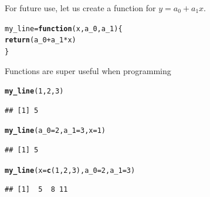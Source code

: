 \documentclass[aspectratio=169]{beamer}\usepackage[]{graphicx}\usepackage[]{xcolor}
\makeatletter
\newcommand{\hlnum}[1]{\textcolor[rgb]{0.686,0.059,0.569}{#1}}%
\newcommand{\hlopt}[1]{\textcolor[rgb]{0,0,0}{#1}}%
\newcommand{\hlstd}[1]{\textcolor[rgb]{0.345,0.345,0.345}{#1}}%
\newcommand{\hlkwa}[1]{\textcolor[rgb]{0.161,0.373,0.58}{\textbf{#1}}}%
\newcommand{\hlkwb}[1]{\textcolor[rgb]{0.69,0.353,0.396}{#1}}%
\newcommand{\hlkwc}[1]{\textcolor[rgb]{0.333,0.667,0.333}{#1}}%
\newcommand{\hlkwd}[1]{\textcolor[rgb]{0.737,0.353,0.396}{\textbf{#1}}}%
\newenvironment{kframe}{%
 \def\at@end@of@kframe{}%
 \ifinner\ifhmode%
  \def\at@end@of@kframe{\end{minipage}}%
  \begin{minipage}{\columnwidth}%
 \fi\fi%
 \def\FrameCommand##1{\hskip\@totalleftmargin \hskip-\fboxsep
 \colorbox{shadecolor}{##1}\hskip-\fboxsep
     \hskip-\linewidth \hskip-\@totalleftmargin \hskip\columnwidth}%
 \MakeFramed {\advance\hsize-\width
   \@totalleftmargin\z@ \linewidth\hsize
   \@setminipage}}%
 {\par\unskip\endMakeFramed%
 \at@end@of@kframe}
\newenvironment{knitrout}{}{} %
\makeatother
\begin{document}
\begin{frame}[fragile]
For future use, let us create a function for $y = a_0 + a_1x$.

\begin{knitrout}
\color{fgcolor}\begin{kframe}
\begin{alltt}
\hlstd{my_line} \hlkwb{=} \hlkwa{function}\hlstd{(}\hlkwc{x}\hlstd{,} \hlkwc{a_0}\hlstd{,} \hlkwc{a_1}\hlstd{)\{}
    \hlkwd{return}\hlstd{(a_0} \hlopt{+} \hlstd{a_1}\hlopt{*}\hlstd{x)}
\hlstd{\}}
\end{alltt}
\end{kframe}
\end{knitrout}

Functions are super useful when programming

\begin{knitrout}
\color{fgcolor}\begin{kframe}
\begin{alltt}
\hlkwd{my_line}\hlstd{(}\hlnum{1}\hlstd{,}\hlnum{2}\hlstd{,}\hlnum{3}\hlstd{)}
\end{alltt}
\begin{verbatim}
## [1] 5
\end{verbatim}
\begin{alltt}
\hlkwd{my_line}\hlstd{(}\hlkwc{a_0} \hlstd{=} \hlnum{2}\hlstd{,} \hlkwc{a_1} \hlstd{=} \hlnum{3}\hlstd{,} \hlkwc{x} \hlstd{=} \hlnum{1}\hlstd{)}
\end{alltt}
\begin{verbatim}
## [1] 5
\end{verbatim}
\begin{alltt}
\hlkwd{my_line}\hlstd{(}\hlkwc{x} \hlstd{=} \hlkwd{c}\hlstd{(}\hlnum{1}\hlstd{,}\hlnum{2}\hlstd{,}\hlnum{3}\hlstd{),} \hlkwc{a_0} \hlstd{=} \hlnum{2}\hlstd{,} \hlkwc{a_1} \hlstd{=} \hlnum{3}\hlstd{)}
\end{alltt}
\begin{verbatim}
## [1]  5  8 11
\end{verbatim}
\end{kframe}
\end{knitrout}
\end{frame}
\end{document}
